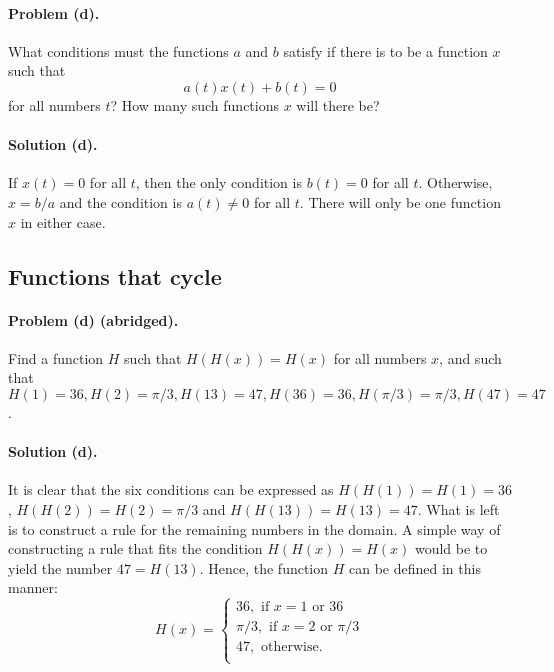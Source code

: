 \documentclass{article}
\begin{document}
\paragraph{Problem (d).} What conditions must the functions $a$ and $b$ satisfy
if there is to be a function $x$ such that \begin{equation*}
  a(t)x(t) + b(t) = 0
\end{equation*} for all numbers $t$? How many such functions $x$ will there be?

\paragraph{Solution (d).} If $x(t) = 0$ for all $t$, then the only condition is
$b(t) = 0$ for all $t$. Otherwise, $x = b/a$ and the condition is $a(t) \neq 0$
for all $t$. There will only be one function $x$ in either case.

\setcounter{subsection}{10}
\subsection{Functions that cycle}

\paragraph{Problem (d) (abridged).} Find a function $H$ such that $H(H(x)) =
H(x)$ for all numbers $x$, and such that $H(1) = 36, H(2) = \pi/3, H(13) = 47,
H(36) = 36, H(\pi/3) = \pi/3, H(47) = 47$.

\paragraph{Solution (d).} It is clear that the six conditions can be expressed
as $H(H(1)) = H(1) = 36$, $H(H(2)) = H(2) = \pi/3$ and $H(H(13)) = H(13) = 47$.
What is left is to construct a rule for the remaining numbers in the domain. A
simple way of constructing a rule that fits the condition $H(H(x)) = H(x)$
would be to yield the number $47 = H(13)$. Hence, the function $H$ can be
defined in this manner: \begin{equation*}
  H(x) = \begin{cases}
    36, \text{ if } x = 1 \text{ or } 36 \\
    \pi/3, \text{ if } x = 2 \text{ or } \pi/3 \\
    47, \text{ otherwise.} \\
  \end{cases}
\end{equation*}
\end{document}
